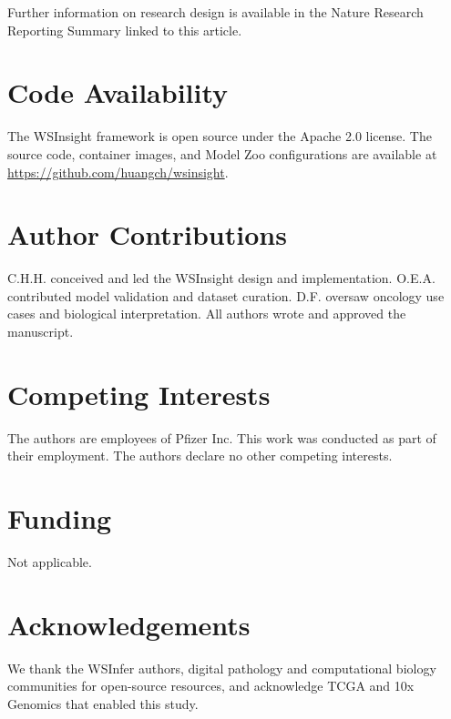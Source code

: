 \documentclass[sn-mathphys-num]{sn-jnl}%
\theoremstyle{thmstyleone}%
\theoremstyle{thmstyletwo}%
\theoremstyle{thmstylethree}%
\begin{document}
	Further information on research design is available in the Nature Research Reporting Summary linked to this article.
	
	
	\section{Code Availability}
	
	The WSInsight framework is open source under the Apache 2.0 license. The source code, container images, and Model Zoo configurations are available at \url{https://github.com/huangch/wsinsight}. %
	
	\section{Author Contributions}
	
	C.H.H. conceived and led the WSInsight design and implementation. O.E.A. contributed model validation and dataset curation. D.F. oversaw oncology use cases and biological interpretation. All authors wrote and approved the manuscript.
	
	\section{Competing Interests}
	
	The authors are employees of Pfizer Inc. This work was conducted as part of their employment. The authors declare no other competing interests.
	
	\section{Funding}
	
	Not applicable.
	
	\section{Acknowledgements}
	
	We thank the WSInfer authors, digital pathology and computational biology communities for open-source resources, and acknowledge TCGA and 10x Genomics that enabled this study.
	
	
	
\end{document}
